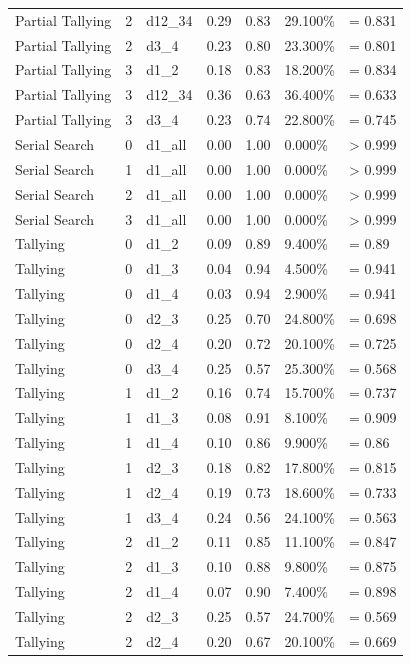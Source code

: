 \documentclass[
  english,
  man]{apa6}
\begin{document}
\begin{center}
\begin{ThreePartTable}
\begin{longtable}{lllllll}
Partial Tallying & 2 & d12\_34 & 0.29 & 0.83 & 29.100\% & = 0.831\\
Partial Tallying & 2 & d3\_4 & 0.23 & 0.80 & 23.300\% & = 0.801\\
Partial Tallying & 3 & d1\_2 & 0.18 & 0.83 & 18.200\% & = 0.834\\
Partial Tallying & 3 & d12\_34 & 0.36 & 0.63 & 36.400\% & = 0.633\\
Partial Tallying & 3 & d3\_4 & 0.23 & 0.74 & 22.800\% & = 0.745\\
Serial Search & 0 & d1\_all & 0.00 & 1.00 & 0.000\% & > 0.999\\
Serial Search & 1 & d1\_all & 0.00 & 1.00 & 0.000\% & > 0.999\\
Serial Search & 2 & d1\_all & 0.00 & 1.00 & 0.000\% & > 0.999\\
Serial Search & 3 & d1\_all & 0.00 & 1.00 & 0.000\% & > 0.999\\
Tallying & 0 & d1\_2 & 0.09 & 0.89 & 9.400\% & = 0.89\\
Tallying & 0 & d1\_3 & 0.04 & 0.94 & 4.500\% & = 0.941\\
Tallying & 0 & d1\_4 & 0.03 & 0.94 & 2.900\% & = 0.941\\
Tallying & 0 & d2\_3 & 0.25 & 0.70 & 24.800\% & = 0.698\\
Tallying & 0 & d2\_4 & 0.20 & 0.72 & 20.100\% & = 0.725\\
Tallying & 0 & d3\_4 & 0.25 & 0.57 & 25.300\% & = 0.568\\
Tallying & 1 & d1\_2 & 0.16 & 0.74 & 15.700\% & = 0.737\\
Tallying & 1 & d1\_3 & 0.08 & 0.91 & 8.100\% & = 0.909\\
Tallying & 1 & d1\_4 & 0.10 & 0.86 & 9.900\% & = 0.86\\
Tallying & 1 & d2\_3 & 0.18 & 0.82 & 17.800\% & = 0.815\\
Tallying & 1 & d2\_4 & 0.19 & 0.73 & 18.600\% & = 0.733\\
Tallying & 1 & d3\_4 & 0.24 & 0.56 & 24.100\% & = 0.563\\
Tallying & 2 & d1\_2 & 0.11 & 0.85 & 11.100\% & = 0.847\\
Tallying & 2 & d1\_3 & 0.10 & 0.88 & 9.800\% & = 0.875\\
Tallying & 2 & d1\_4 & 0.07 & 0.90 & 7.400\% & = 0.898\\
Tallying & 2 & d2\_3 & 0.25 & 0.57 & 24.700\% & = 0.569\\
Tallying & 2 & d2\_4 & 0.20 & 0.67 & 20.100\% & = 0.669\\

\end{longtable}
\end{ThreePartTable}
\end{center}
\end{document}
